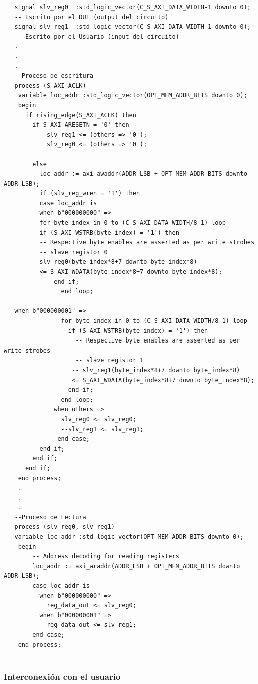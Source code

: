 \documentclass[a4paper,openright,12pt]{report}
\begin{document}
   
   \begin{lstlisting}
   signal slv_reg0	:std_logic_vector(C_S_AXI_DATA_WIDTH-1 downto 0);
   -- Escrito por el DUT (output del circuito)
   signal slv_reg1	:std_logic_vector(C_S_AXI_DATA_WIDTH-1 downto 0);
   -- Escrito por el Usuario (input del circuito)
   .
   .
   .
   --Proceso de escritura
   process (S_AXI_ACLK)
	variable loc_addr :std_logic_vector(OPT_MEM_ADDR_BITS downto 0); 
	begin
	  if rising_edge(S_AXI_ACLK) then 
	    if S_AXI_ARESETN = '0' then
	      --slv_reg1 <= (others => '0');
            slv_reg0 <= (others => '0');
        
        else
	      loc_addr := axi_awaddr(ADDR_LSB + OPT_MEM_ADDR_BITS downto ADDR_LSB);
	      if (slv_reg_wren = '1') then
	      case loc_addr is
	      when b"000000000" =>
	      for byte_index in 0 to (C_S_AXI_DATA_WIDTH/8-1) loop
	      if (S_AXI_WSTRB(byte_index) = '1') then
	      -- Respective byte enables are asserted as per write strobes                   
	      -- slave registor 0
	      slv_reg0(byte_index*8+7 downto byte_index*8)
          <= S_AXI_WDATA(byte_index*8+7 downto byte_index*8);
	          end if;
	            end loop;
   
   when b"000000001" =>
	            for byte_index in 0 to (C_S_AXI_DATA_WIDTH/8-1) loop
	              if (S_AXI_WSTRB(byte_index) = '1') then
	                -- Respective byte enables are asserted as per write strobes                   
	                -- slave registor 1
	               -- slv_reg1(byte_index*8+7 downto byte_index*8)
                   <= S_AXI_WDATA(byte_index*8+7 downto byte_index*8);
	              end if;
	            end loop;
	          when others =>
	            slv_reg0 <= slv_reg0;
	            --slv_reg1 <= slv_reg1;
               end case;
	      end if;
	    end if;
	  end if;                   
	end process;
    .
    .
    .
   --Proceso de Lectura
   process (slv_reg0, slv_reg1)
   variable loc_addr :std_logic_vector(OPT_MEM_ADDR_BITS downto 0);
	begin
	    -- Address decoding for reading registers
	    loc_addr := axi_araddr(ADDR_LSB + OPT_MEM_ADDR_BITS downto ADDR_LSB);
	    case loc_addr is
	      when b"000000000" =>
	        reg_data_out <= slv_reg0;
	      when b"000000001" =>
	        reg_data_out <= slv_reg1;
	    end case;
	end process; 
   
   \end{lstlisting}
    
    \subsubsection{Interconexión con el usuario}
    
\end{document}
